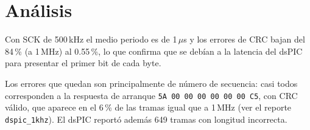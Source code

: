 \section{Análisis}

Con SCK de 500\,kHz el medio periodo es de 1\,$\mu$s y los errores de CRC
bajan del 84\,\% (a 1\,MHz) al 0.55\,\%, lo que confirma que se debían a la
latencia del dsPIC para presentar el primer bit de cada byte.

Los errores que quedan son principalmente de número de secuencia: casi todos
corresponden a la respuesta de arranque \texttt{5A 00 00 00 00 00 00 C5}, con
CRC válido, que aparece en el 6\,\% de las tramas igual que a 1\,MHz (ver el
reporte \texttt{dspic\_1khz}). El dsPIC reportó además 649 tramas con
longitud incorrecta.
